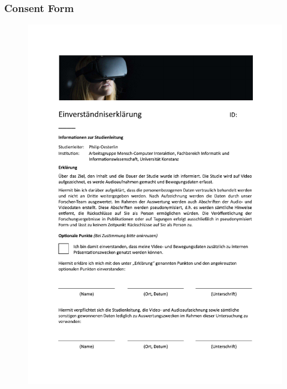 \subsubsection{Consent Form}
\begin{figure}[!h]
\centering
\includegraphics[width=\textwidth]{figures/Appendix/consent form.pdf}
\end{figure}

